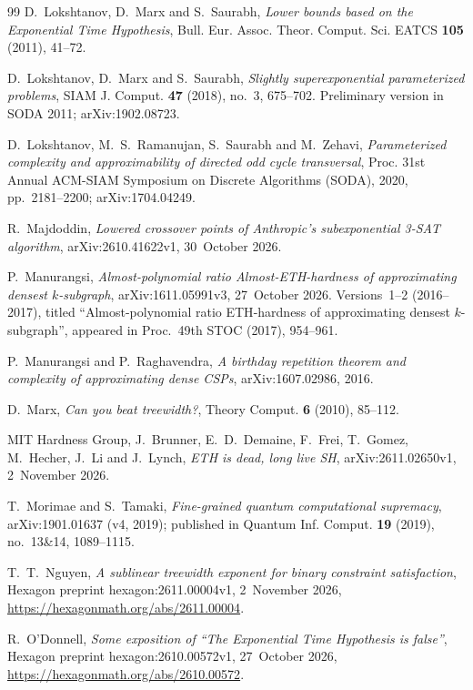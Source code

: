 \documentclass[10pt]{amsart}
\theoremstyle{plain}
\theoremstyle{definition}
\theoremstyle{remark}
\numberwithin{equation}{section}
\begin{document}
\begin{thebibliography}{99}
D.~Lokshtanov, D.~Marx and S.~Saurabh, \emph{Lower bounds based on the {E}xponential {T}ime
{H}ypothesis}, Bull. Eur. Assoc. Theor. Comput. Sci. EATCS \textbf{105} (2011), 41--72.

D.~Lokshtanov, D.~Marx and S.~Saurabh, \emph{Slightly superexponential parameterized problems}, SIAM
J. Comput. \textbf{47} (2018), no.~3, 675--702. Preliminary version in SODA 2011; arXiv:1902.08723.

D.~Lokshtanov, M.~S.~Ramanujan, S.~Saurabh and M.~Zehavi, \emph{Parameterized complexity and
approximability of directed odd cycle transversal}, Proc. 31st Annual ACM-SIAM Symposium on
Discrete Algorithms (SODA), 2020, pp.~2181--2200; arXiv:1704.04249.

R.~Majdoddin, \emph{Lowered crossover points of {A}nthropic's subexponential 3-{SAT} algorithm},
arXiv:2610.41622v1, 30~October 2026.

P.~Manurangsi, \emph{Almost-polynomial ratio {A}lmost-{ETH}-hardness of approximating densest
$k$-subgraph}, arXiv:1611.05991v3, 27~October 2026. Versions~1--2 (2016--2017), titled
``Almost-polynomial ratio {ETH}-hardness of approximating densest $k$-subgraph'', appeared in
Proc.\ 49th STOC (2017), 954--961.

P.~Manurangsi and P.~Raghavendra, \emph{A birthday repetition theorem and complexity of
approximating dense {CSP}s}, arXiv:1607.02986, 2016.

D.~Marx, \emph{Can you beat treewidth?}, Theory Comput. \textbf{6} (2010), 85--112.

MIT Hardness Group, J.~Brunner, E.~D.~Demaine, F.~Frei, T.~Gomez, M.~Hecher, J.~Li and J.~Lynch,
\emph{{ETH} is dead, long live {SH}}, arXiv:2611.02650v1, 2~November 2026.

T.~Morimae and S.~Tamaki, \emph{Fine-grained quantum computational supremacy}, arXiv:1901.01637
(v4, 2019); published in Quantum Inf. Comput. \textbf{19} (2019), no.~13\&14, 1089--1115.

T.~T.~Nguyen, \emph{A sublinear treewidth exponent for binary constraint satisfaction}, Hexagon
preprint hexagon:2611.00004v1, 2~November 2026, \url{https://hexagonmath.org/abs/2611.00004}.

R.~O'Donnell, \emph{Some exposition of ``{T}he {E}xponential {T}ime {H}ypothesis is false''}, Hexagon
preprint hexagon:2610.00572v1, 27~October 2026, \url{https://hexagonmath.org/abs/2610.00572}.


\end{thebibliography}
\end{document}
